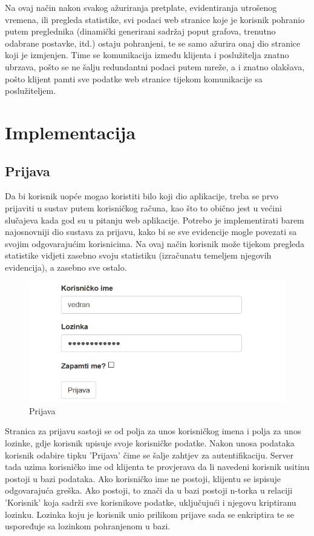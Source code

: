 \documentclass[times, utf8, zavrsni]{fer}
\begin{document}
\lstset{style=js}


Na ovaj način nakon svakog ažuriranja pretplate, evidentiranja utrošenog vremena, ili pregleda statistike, svi podaci web stranice koje je korisnik pohranio putem preglednika (dinamički generirani sadržaj poput grafova, trenutno odabrane postavke, itd.) ostaju pohranjeni, te se samo ažurira onaj dio stranice koji je izmjenjen. Time se komunikacija između klijenta i poslužitelja znatno ubrzava, pošto se ne šalju redundantni podaci putem mreže, a i znatno olakšava, pošto klijent pamti sve podatke web stranice tijekom komunikacije sa poslužiteljem.

\section{Implementacija}
\subsection{Prijava}
Da bi korisnik uopće mogao koristiti bilo koji dio aplikacije, treba se prvo prijaviti u sustav putem korisničkog računa, kao što to obično jest u većini slučajeva kada god su u pitanju web aplikacije. Potrebo je implementirati barem najosnovniji dio sustava za prijavu, kako bi se sve evidencije mogle povezati sa svojim odgovarajućim korisnicima. Na ovaj način korisnik može tijekom pregleda statistike vidjeti zasebno svoju statistiku (izračunatu temeljem njegovih evidencija), a zasebno sve ostalo.

\begin{figure}[H]
\centering
\includegraphics{img/prijava.png}
\caption{Prijava}
\label{fig:prijava}
\end{figure}

Stranica za prijavu sastoji se od polja za unos korisničkog imena i polja za unos lozinke, gdje korisnik upisuje svoje korisničke podatke. Nakon unosa podataka korisnik odabire tipku 'Prijava' čime se šalje zahtjev za autentifikaciju. Server tada uzima korisničko ime od klijenta te provjerava da li navedeni korisnik usitinu postoji u bazi podataka. Ako korisničko ime ne postoji, klijentu se ispisuje odgovarajuća greška. Ako postoji, to znači da u bazi postoji n-torka u relaciji 'Korisnik' koja sadrži sve korisnikove podatke, uključujući i njegovu kriptiranu lozinku. Lozinka koju je korisnik unio prilikom prijave sada se enkriptira te se uspoređuje sa lozinkom pohranjenom u bazi.
\end{document}
